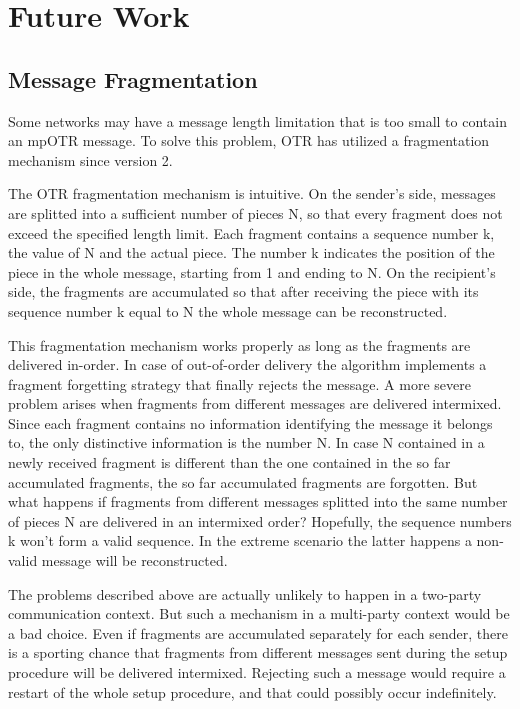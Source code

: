 \chapter{Future Work}
\label{chapters:FutureWork}

\section{Message Fragmentation}
\label{sections:fragmentation}
Some networks may have a message length limitation that is too small to contain an mpOTR message. To solve this problem, OTR has utilized a fragmentation mechanism since version 2.

The OTR fragmentation mechanism is intuitive. On the sender's side, messages are splitted into a sufficient number of pieces N, so that every fragment does not exceed the specified length limit. Each fragment contains a sequence number k, the value of N and the actual piece. The number k indicates the position of the piece in the whole message, starting from 1 and ending to N. On the recipient's side, the fragments are accumulated so that after receiving the piece with its sequence number k equal to N the whole message can be reconstructed.

This fragmentation mechanism works properly as long as the fragments are delivered in-order. In case of out-of-order delivery the algorithm implements a fragment forgetting strategy that finally rejects the message. A more severe problem arises when fragments from different messages are delivered intermixed. Since each fragment contains no information identifying the message it belongs to, the only distinctive information is the number N. In case N contained in a newly received fragment is different than the one contained in the so far accumulated fragments, the so far accumulated fragments are forgotten. But what happens if fragments from different messages splitted into the same number of pieces N are delivered in an intermixed order? Hopefully, the sequence numbers k won't form a valid sequence. In the extreme scenario the latter happens a non-valid message will be reconstructed.

The problems described above are actually unlikely to happen in a two-party communication context. But such a mechanism in a multi-party context would be a bad choice. Even if fragments are accumulated separately for each sender, there is a sporting chance that fragments from different messages sent during the setup procedure will be delivered intermixed. Rejecting such a message would require a restart of the whole setup procedure, and that could possibly occur indefinitely.

